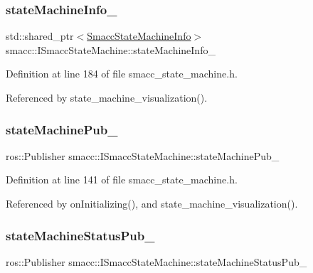 \subsubsection{\texorpdfstring{state\+Machine\+Info\+\_\+}{stateMachineInfo\_}}
{\footnotesize\ttfamily std\+::shared\+\_\+ptr$<$\hyperlink{classsmacc_1_1introspection_1_1SmaccStateMachineInfo}{Smacc\+State\+Machine\+Info}$>$ smacc\+::\+I\+Smacc\+State\+Machine\+::state\+Machine\+Info\+\_\+\hspace{0.3cm}{\ttfamily [private]}}



Definition at line 184 of file smacc\+\_\+state\+\_\+machine.\+h.



Referenced by state\+\_\+machine\+\_\+visualization().

\mbox{\label{classsmacc_1_1ISmaccStateMachine_af4aa9fed70bd4c57b19e3370fbd25de7}} 
\subsubsection{\texorpdfstring{state\+Machine\+Pub\+\_\+}{stateMachinePub\_}}
{\footnotesize\ttfamily ros\+::\+Publisher smacc\+::\+I\+Smacc\+State\+Machine\+::state\+Machine\+Pub\+\_\+\hspace{0.3cm}{\ttfamily [protected]}}



Definition at line 141 of file smacc\+\_\+state\+\_\+machine.\+h.



Referenced by on\+Initializing(), and state\+\_\+machine\+\_\+visualization().

\mbox{\label{classsmacc_1_1ISmaccStateMachine_a55a7c7b26ad4dfea441c62c6326a5414}} 
\subsubsection{\texorpdfstring{state\+Machine\+Status\+Pub\+\_\+}{stateMachineStatusPub\_}}
{\footnotesize\ttfamily ros\+::\+Publisher smacc\+::\+I\+Smacc\+State\+Machine\+::state\+Machine\+Status\+Pub\+\_\+\hspace{0.3cm}{\ttfamily [protected]}}



